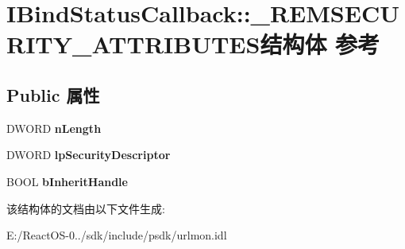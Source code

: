 \hypertarget{struct_i_bind_status_callback_1_1___r_e_m_s_e_c_u_r_i_t_y___a_t_t_r_i_b_u_t_e_s}{}\section{I\+Bind\+Status\+Callback\+:\+:\+\_\+\+R\+E\+M\+S\+E\+C\+U\+R\+I\+T\+Y\+\_\+\+A\+T\+T\+R\+I\+B\+U\+T\+E\+S结构体 参考}
\label{struct_i_bind_status_callback_1_1___r_e_m_s_e_c_u_r_i_t_y___a_t_t_r_i_b_u_t_e_s}
\subsection*{Public 属性}
\begin{DoxyCompactItemize}
\item 
\mbox{\label{struct_i_bind_status_callback_1_1___r_e_m_s_e_c_u_r_i_t_y___a_t_t_r_i_b_u_t_e_s_abe6c56b4c28e7288cb64d38fd15a3883}} 
D\+W\+O\+RD {\bfseries n\+Length}
\item 
\mbox{\label{struct_i_bind_status_callback_1_1___r_e_m_s_e_c_u_r_i_t_y___a_t_t_r_i_b_u_t_e_s_a199069da036379ed2d43843529704128}} 
D\+W\+O\+RD {\bfseries lp\+Security\+Descriptor}
\item 
\mbox{\label{struct_i_bind_status_callback_1_1___r_e_m_s_e_c_u_r_i_t_y___a_t_t_r_i_b_u_t_e_s_a55712db04bfc34d8f900cf16389b4d0a}} 
B\+O\+OL {\bfseries b\+Inherit\+Handle}
\end{DoxyCompactItemize}


该结构体的文档由以下文件生成\+:\begin{DoxyCompactItemize}
\item 
E\+:/\+React\+O\+S-\/0../sdk/include/psdk/urlmon.\+idl\end{DoxyCompactItemize}
